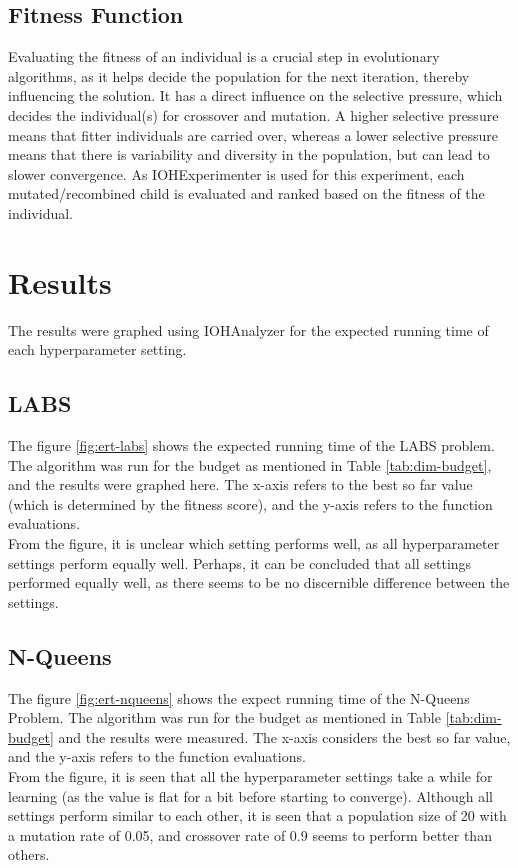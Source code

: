 \documentclass{article}
\begin{document}
\subsection{Fitness Function}
Evaluating the fitness of an individual is a crucial step in evolutionary algorithms, as it helps decide the population for the next iteration, thereby influencing the solution. It has a direct influence on the selective pressure, which decides the individual(s) for crossover and mutation.  A higher selective pressure means that fitter individuals are carried over, whereas a lower selective pressure means that there is variability and diversity in the population, but can lead to slower convergence. As IOHExperimenter is used for this experiment, each mutated/recombined child is evaluated and ranked based on the fitness of the individual. 

\section{Results}\label{sec:results}
The results were graphed using IOHAnalyzer \cite{IOHanalyzer} for the expected running time of each hyperparameter setting. 

\subsection{LABS}
The figure \ref{fig:ert-labs} shows the expected running time of the LABS problem. The algorithm was run for the budget as mentioned in Table \ref{tab:dim-budget}, and the results were graphed here.  The x-axis refers to the best so far value (which is determined by the fitness score), and the y-axis refers to the function evaluations. \\
From the figure, it is unclear which setting performs well, as all hyperparameter settings perform equally well.  Perhaps, it can be concluded that all settings performed equally well, as there seems to be no discernible difference between the settings. 


\subsection{N-Queens} \label{app:f23-runningtime}
The figure \ref{fig:ert-nqueens} shows the expect running time of the N-Queens Problem. The algorithm was run for the budget as mentioned in Table \ref{tab:dim-budget} and the results were measured. The x-axis considers the best so far value, and the y-axis refers to the function evaluations. \\
From the figure, it is seen that all the hyperparameter settings take a while for learning (as the value is flat for a bit before starting to converge). Although all settings perform similar to each other, it is seen that a population size of 20 with a mutation rate of 0.05, and crossover rate of 0.9 seems to perform better than others. 
\end{document}
